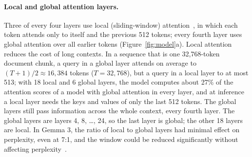 \documentclass[sigconf,nonacm,balance=false]{acmart}
\begin{document}
\paragraph{Local and global attention layers.} Three of every four layers use local (sliding-window)
attention~\cite{gemma2025gemma3}, in which each token attends only to itself and the previous 512 tokens; every
fourth layer uses global attention over all earlier tokens (Figure~\ref{fig:model}a). Local attention reduces the cost
of long contexts. In a sequence that is one 32,768-token document chunk, a query in a global layer attends on average
to $(T + 1)/2 \approx 16{,}384$ tokens ($T = 32{,}768$), but a query in a local layer to at most 513; with 18 local and
6 global layers, the model computes about 27\% of the attention scores of a model with global attention in every
layer, and at inference a local layer needs the keys and values of only the last 512 tokens. The global layers still
pass information across the whole context, every fourth layer. The global layers are layers 4, 8, \ldots, 24, so the
last layer is global; the other 18 layers are local. In Gemma 3, the ratio of local to global layers had minimal
effect on perplexity, even at 7:1, and the window could be reduced significantly without affecting
perplexity~\cite{gemma2025gemma3}.
\end{document}
